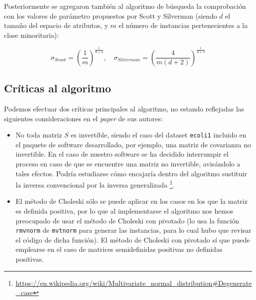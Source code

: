 Posteriormente se agregaron también al algoritmo de búsqueda la comprobación con los valores de parámetro propuestos por Scott
y Silverman (siendo $d$ el tamaño del espacio de atributos, y $m$ el número de instancias pertenecientes a la clase minoritaria):

\[\sigma_{Scoot} = \left(\frac{1}{m}\right)^{\frac{1}{d+4}}, \quad \sigma_{Silverman} = \left(\frac{4}{m(d+2)}\right)^{\frac{1}{d+4}}\]

\subsection{Críticas al algoritmo}
Podemos efectuar dos críticas principales al algoritmo, no estando reflejadas las siguientes consideraciones en el \textit{paper}
de sus autores:

\begin{itemize} 
 \item No toda matriz $S$ es invertible, siendo el caso del dataset \texttt{ecoli1} incluido en el paquete de software 
 desarrollado, por ejemplo, una matriz de covarianza no invertible. En el caso de nuestro software se ha decidido interrumpir
 el proceso en caso de que se encuentre una matriz no invertible, avisándolo a tales efectos. Podría estudiarse cómo encajaría
 dentro del algoritmo sustituir la inversa convencional por la inversa generalizada 
 \footnote{\url{https://en.wikipedia.org/wiki/Multivariate_normal_distribution\#Degenerate_case}}.

 \item El método de Choleski sólo se puede aplicar en los casos en los que la matriz es definida positiva, por lo que 
 al implementarse el algoritmo nos hemos preocupado de usar el método de Choleski con pivotado (lo usa la función \texttt{rmvnorm}
 de \texttt{mvtnorm} para generar las instancias, para lo cual hubo que revisar el código de dicha función). El método
 de Choleski con pivotado sí que puede emplearse en el caso de matrices semidefinidas positivas no definidas positivas.
\end{itemize}
